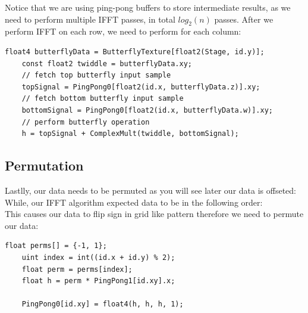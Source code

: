 Notice that we are using ping-pong buffers to store intermediate results, as we need to perform multiple IFFT passes, in total $log_2(n)$ passes.
After we perform IFFT on each row, we need to perform for each column:
\begin{lstlisting}[caption={Vertical Butterfly Operation}, frame=single, numberstyle=\small\color{gray}, captionpos=b]
    float4 butterflyData = ButterflyTexture[float2(Stage, id.y)];
    const float2 twiddle = butterflyData.xy;
    // fetch top butterfly input sample
    topSignal = PingPong0[float2(id.x, butterflyData.z)].xy;
    // fetch bottom butterfly input sample
    bottomSignal = PingPong0[float2(id.x, butterflyData.w)].xy;
    // perform butterfly operation
    h = topSignal + ComplexMult(twiddle, bottomSignal);
\end{lstlisting}

\subsection*{Permutation}
Lastlly, our data needs to be permuted as you will see later our data is offseted:
\begin{equation}
    [\text{freq} (-N / 2), \text{ ...}, \text{ freq} (-1), \text{ freq} (0), \text{ freq} (1), \text{ ...}, \text{ freq} (N / 2 - 1)]
\end{equation}
While, our IFFT algorithm expected data to be in the following order:
\begin{equation}
    [\text{freq} (0), \text{ freq} (1), \text{ ...}, \text{ freq}(N - 1)]
\end{equation}
This causes our data to flip sign in grid like pattern therefore we need to permute our data:
\begin{lstlisting}[caption={Data Permutation \cite{flugge2017} }, frame=single, numberstyle=\small\color{gray}, captionpos=b]
    float perms[] = {-1, 1};
    uint index = int((id.x + id.y) % 2);
    float perm = perms[index];
    float h = perm * PingPong1[id.xy].x;
    
    PingPong0[id.xy] = float4(h, h, h, 1);
\end{lstlisting}

